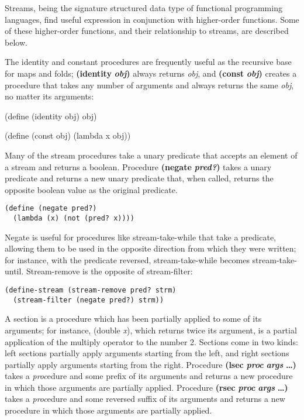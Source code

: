 Streams, being the signature structured data type of functional
programming languages, find useful expression in conjunction with
higher-order functions. Some of these higher-order functions, and their
relationship to streams, are described below.

The identity and constant procedures are frequently useful as the
recursive base for maps and folds; \textbf{(identity}
\textbf{\emph{obj})} always returns \emph{obj}, and \textbf{(const}
\textbf{\emph{obj})} creates a procedure that takes any number of
arguments and always returns the same \emph{obj}, no matter its
arguments:

(define (identity obj) obj)

(define (const obj) (lambda x obj))

Many of the stream procedures take a unary predicate that accepts an
element of a stream and returns a boolean. Procedure \textbf{(negate}
\textbf{\emph{pred?})} takes a unary predicate and returns a new unary
predicate that, when called, returns the opposite boolean value as the
original predicate.

\begin{verbatim}
(define (negate pred?)
  (lambda (x) (not (pred? x))))
\end{verbatim}

Negate is useful for procedures like stream-take-while that take a
predicate, allowing them to be used in the opposite direction from which
they were written; for instance, with the predicate reversed,
stream-take-while becomes stream-take-until. Stream-remove is the
opposite of stream-filter:

\begin{verbatim}
(define-stream (stream-remove pred? strm)
  (stream-filter (negate pred?) strm))
\end{verbatim}

A section is a procedure which has been partially applied to some of its
arguments; for instance, (double \emph{x}), which returns twice its
argument, is a partial application of the multiply operator to the
number 2. Sections come in two kinds: left sections partially apply
arguments starting from the left, and right sections partially apply
arguments starting from the right. Procedure \textbf{(lsec}
\textbf{\emph{proc}} \textbf{} \textbf{\emph{args}} \textbf{\ldots{})}
takes a \emph{proc}edure and some prefix of its arguments and returns a
new procedure in which those arguments are partially applied. Procedure
\textbf{(rsec} \textbf{\emph{proc}} \textbf{} \textbf{\emph{args}}
\textbf{\ldots{})} takes a \emph{proc}edure and some reversed suffix of
its arguments and returns a new procedure in which those arguments are
partially applied.

